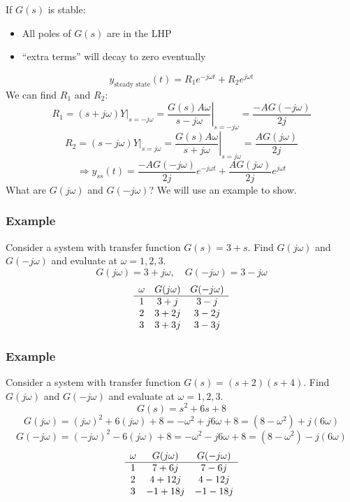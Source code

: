 \documentclass{book}
\newcommand{\jw}{j\omega}
\newcommand{\wt}{\omega t}
\newcommand{\exmp}{\subsubsection*{Example}}
\begin{document}
If $ G(s) $ is stable:
\begin{itemize}
	\item All poles of $ G(s) $ are in the LHP
	\item ``extra terms'' will decay to zero eventually
\end{itemize}
\[ y_{\text{steady state}}(t) = R_1 e^{-j\wt} + R_2 e^{j\wt} \]
We can find $ R_1 $ and $ R_2 $:
\[ R_1 = (s+\jw)Y\big|_{s=-\jw} = \left.\frac{G(s)A\omega}{s-\jw}\right|_{s=-\jw} = \frac{-AG(-\jw)}{2j} \]
\[ R_2 = (s-\jw)Y\big|_{s=\jw} = \left.\frac{G(s)A\omega}{s+\jw}\right|_{s=\jw} = \frac{AG(\jw)}{2j} \]
\[ \Rightarrow y_{ss}(t) = \frac{-AG(-\jw)}{2j} e^{-j\wt} + \frac{AG(\jw)}{2j} e^{j\wt} \]
What are $ G(\jw) $ and $ G(-\jw) $? We will use an example to show.

\exmp
Consider a system with transfer function $ G(s) = 3+s $. Find $ G(\jw) $ and $ G(-\jw) $ and evaluate at $ \omega=1,2,3 $.
\[ G(\jw) = 3+\jw,\quad G(-\jw) = 3-\jw \]
\[ \begin{array}{c c c}
\omega & G(\jw) & G(-\jw) \\ \hline
1 & 3+j & 3-j \\
2 & 3+2j & 3-2j \\
3 & 3+3j & 3-3j
\end{array} \]

\exmp
Consider a system with transfer function $ G(s) = (s+2)(s+4) $. Find $ G(\jw) $ and $ G(-\jw) $ and evaluate at $ \omega=1,2,3 $.
\[ G(s) = s^2+6s+8 \]
\[ G(\jw) = (\jw)^2+6(\jw)+8 = -\omega^2 + j6\omega + 8 = (8-\omega^2) + j(6\omega) \]
\[ G(-\jw) = (-\jw)^2-6(\jw)+8 = -\omega^2 - j6\omega + 8 = (8-\omega^2) - j(6\omega) \]
\[ \begin{array}{c c c}
\omega & G(\jw) & G(-\jw) \\ \hline
1 & 7+6j & 7-6j \\
2 & 4+12j & 4-12j \\
3 & -1+18j & -1-18j
\end{array} \]
\end{document}
